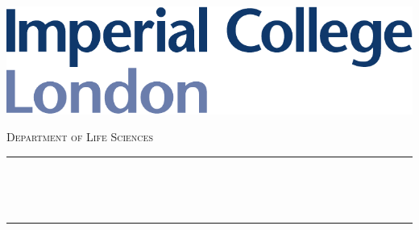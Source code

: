 \begin{titlepage}

    \newcommand{\HRule}{\rule{\linewidth}{0.5mm}} %
    

    
    \begin{flushleft} \large
    \hspace*{-0.5cm}
    \includegraphics[scale=0.6]{./Figure/imperial.pdf}\\
    \end{flushleft}


    \vspace{2cm}
    \begin{center}
    \textsc{\large Department of Life Sciences}\\[0.3cm] 


    \HRule \\[0.4cm]
    \begin{spacing}{1.4}
    { \huge \bfseries \reporttitle}\\ %
    \end{spacing}
    \HRule \\[1.5cm]
    \end{center}
    

\end{titlepage}

